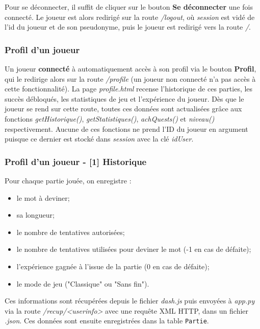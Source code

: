 \tabto{1cm}Pour se déconnecter, il suffit de cliquer sur le bouton \textbf{Se déconnecter} une fois connecté. Le joueur est alors redirigé sur la route \emph{/logout}, où \emph{session} est vidé de l'id du joueur et de son pseudonyme, puis le joueur est redirigé vers la route \emph{/}.

\subsubsection*{Profil d'un joueur}

\tabto{1cm}Un joueur \textbf{connecté} à automatiquement accès à son profil via le bouton \textbf{Profil}, qui le redirige alors sur la route \emph{/profile} (un joueur non connecté n'a pas accès à cette fonctionnalité). La page \emph{profile.html} recense l'historique de ces parties, les succès débloqués, les statistiques de jeu et l'expérience du joueur. Dès que le joueur se rend sur cette route, toutes ces données sont actualisées grâce aux fonctions \emph{getHistorique()}, \emph{getStatistiques()}, \emph{achQuests()} et \emph{niveau()} respectivement. Aucune de ces fonctions ne prend l'ID du joueur en argument puisque ce dernier est stocké dans \emph{session} avec la clé \emph{idUser}.

\subsubsection*{Profil d'un joueur - [1] Historique}

\tabto{0cm}Pour chaque partie jouée, on enregistre :
\begin{itemize}
    \item le mot à deviner;
    \item sa longueur;
    \item le nombre de tentatives autorisées;
    \item le nombre de tentatives utilisées pour deviner le mot (-1 en cas de défaite);
    \item l'expérience gagnée à l'issue de la partie (0 en cas de défaite);
    \item le mode de jeu ("Classique" ou "Sans fin").
\end{itemize}

Ces informations sont récupérées depuis le fichier \emph{dash.js} puis envoyées à \emph{app.py} via la route \emph{/recup/<userinfo>} avec une requête XML HTTP, dans un fichier \emph{.json}. Ces données sont ensuite enregistrées dans la table \texttt{Partie}.\\

